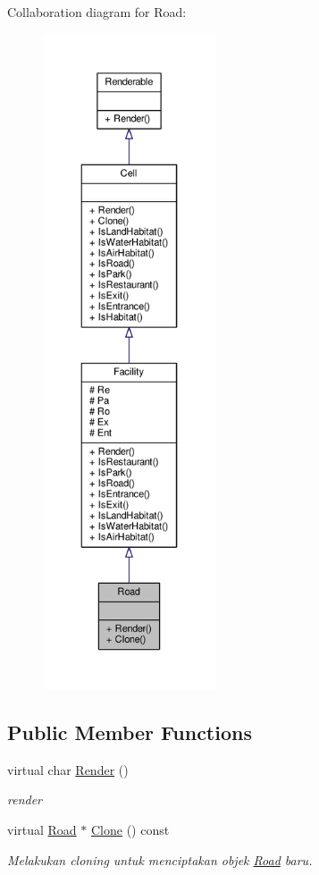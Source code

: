Collaboration diagram for Road\+:
\nopagebreak
\begin{figure}[H]
\begin{center}
\leavevmode
\includegraphics[height=550pt]{classRoad__coll__graph}
\end{center}
\end{figure}
\subsection*{Public Member Functions}
\begin{DoxyCompactItemize}
\item 
virtual char \hyperlink{classRoad_a72268486a71718b5b7957b63ecd565bc}{Render} ()
\begin{DoxyCompactList}\small\item\em render \end{DoxyCompactList}\item 
virtual \hyperlink{classRoad}{Road} $\ast$ \hyperlink{classRoad_a23ca807031dc27cb76d16a808e08beb7}{Clone} () const 
\begin{DoxyCompactList}\small\item\em Melakukan cloning untuk menciptakan objek \hyperlink{classRoad}{Road} baru. \end{DoxyCompactList}\end{DoxyCompactItemize}
